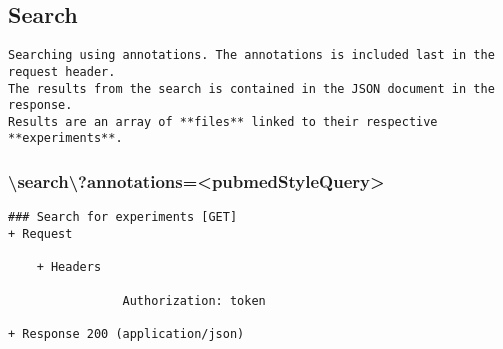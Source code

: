 \subsection*{Search}
\begin{verbatim}
Searching using annotations. The annotations is included last in the request header. 
The results from the search is contained in the JSON document in the response. 
Results are an array of **files** linked to their respective **experiments**.
\end{verbatim}

\subsubsection*{\textbackslash search\textbackslash ?annotations=<pubmedStyleQuery>}
\begin{verbatim}
### Search for experiments [GET]
+ Request

    + Headers
    
                Authorization: token
                
+ Response 200 (application/json)


\end{verbatim}
